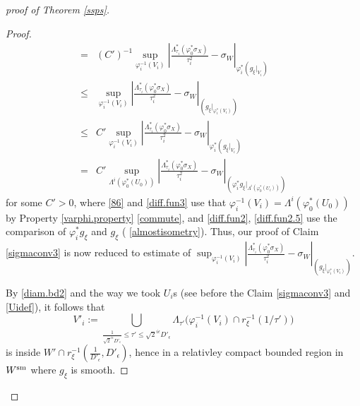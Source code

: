 \documentclass[12pt,a4paper]{amsart}
\theoremstyle{remark}
\theoremstyle{definition}
\begin{document}
\begin{proof}[proof of Theorem \ref{ssps}]
\begin{proof}
\begin{align}
=&\label{86}%
(C')^{-1}\sup_{\varphi_i^{-1}(V_i)}
|\frac{\Lambda_{\tau_i}^*(\varphi_0^*\sigma_X)}{\tau_i^{2}}-\sigma_W|_{\varphi_i^* (g_\xi|_{V_i})} \\
\le 
&\label{diff.fun2}\sup_{\varphi_i^{-1}(V_i)}
|\frac{\Lambda_{\tau_i}^*(\varphi_0^*\sigma_X)}{\tau_i^{2}}-\sigma_W|_{(g_\xi|_{\varphi_i^* (V_i)})} \\
\label{diff.fun2.5}\le %
&C' \sup_{\varphi_i^{-1}(V_i)}
|\frac{\Lambda_{\tau_i}^*(\varphi_0^*\sigma_X)}{\tau_i^{2}}-\sigma_W|_{\varphi_i^* (g_\xi|_{V_i})}\\ 
=\label{diff.fun3}%
&C' \sup_{\Lambda^i(\varphi_0^*(U_0))}
|\frac{\Lambda_{\tau_i}^*(\varphi_0^*\sigma_X)}{\tau_i^{2}}-\sigma_W|_{(\varphi_i^* g_\xi|_{\Lambda^i(\varphi_0^*(U_i))})}
\end{align}
for some $C'>0$, 
where \eqref{86} and \eqref{diff.fun3} use 
that $\varphi_i^{-1}(V_i)=\Lambda^i(\varphi_0^*(U_0))$ 
by 
Property \ref{varphi.property} \eqref{commute}, 
and \eqref{diff.fun2}, \eqref{diff.fun2.5} use the comparison of
$\varphi_i^* g_\xi$ and $g_\xi$ 
(%
\eqref{almostisometry}). Thus, 
our proof of Claim \ref{sigmaconv3} is now reduced to 
estimate of $\sup_{\varphi_i^{-1}(V_i)}
|\frac{\Lambda_{\tau_i}^*(\varphi_0^*\sigma_X)}{\tau_i^{2}}-\sigma_W|_{(g_\xi|_{\varphi_i^* (V_i)})}$. 

By \eqref{diam.bd2} and the way we took $U_i$s 
(see before the Claim \ref{sigmaconv3} and \eqref{Uidef}),  
it follows that 
$$V'_i:=%
\bigcup_{\frac{1}{\sqrt{2}^{i\epsilon}D'_\epsilon}\le \tau'\le \sqrt{2}^{i\epsilon} D'_\epsilon} 
\Lambda_{\tau'}\bigl(\varphi_i^{-1}(V_i)\cap 
r_\xi^{-1}(1/\tau' )\bigr)$$
is inside $W'\cap r_\xi^{-1}(\frac{1}{D'_\epsilon},D'_{\epsilon})$, 
hence in a relativley compact bounded region in $W^{\rm sm}$ 
where $g_\xi$ is smooth. 


\end{proof}
\end{proof}
\end{document}
